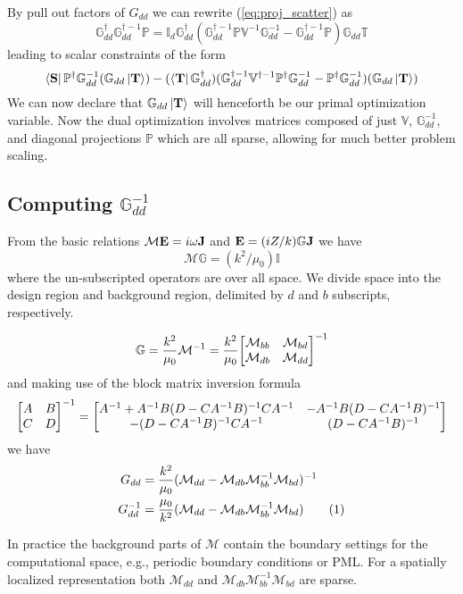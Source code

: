\documentclass[12pt]{article}
\newcommand\numthis{\stepcounter{equation}\tag{\theequation}}
\newcommand\G{\mathbb{G}}
\newcommand\T{\mathbb{T}}
\newcommand\V{\mathbb{V}}
\newcommand\I{\mathbb{I}}
\newcommand\Proj{\mathbb{P}}
\newcommand\M{\mathcal{M}}
\newcommand\om{\omega}
\begin{document}
By pull out factors of $G_{dd}$ we can rewrite (\ref{eq:proj_scatter}) as
\begin{equation}
\G_{dd}^\dagger \G_{dd}^{\dagger-1} \Proj = \I_d \G_{dd}^\dagger (\G_{dd}^{\dagger-1} \Proj \V^{-1} \G_{dd}^{-1} - \G_{dd}^{\dagger-1}\Proj) \G_{dd} \T
\end{equation}
leading to scalar constraints of the form
\begin{equation}
\bra{\vb{S}} \Proj^\dagger \G_{dd}^{-1} (\G_{dd}\ket{\vb{T}}) - (\bra{\vb{T}}\G_{dd}^\dagger) (\G_{dd}^{\dagger-1} \V^{\dagger-1}\Proj^\dagger\G_{dd}^{-1} - \Proj^\dagger\G_{dd}^{-1}) (\G_{dd} \ket{\vb{T}})
\end{equation}
We can now declare that $\G_{dd} \ket{\vb{T}}$ will henceforth be our primal optimization variable. Now the dual optimization involves matrices composed of just $\V$, $\G_{dd}^{-1}$, and diagonal projections $\Proj$ which are all sparse, allowing for much better problem scaling.

\subsection{Computing $\G_{dd}^{-1}$}
From the basic relations $\M\vb{E} = i\om\vb{J}$ and $\vb{E} = (iZ/k)\G \vb{J}$ we have
\begin{equation}
\M\G = (k^2/\mu_0) \I
\end{equation}
where the un-subscripted operators are over all space. We divide space into the design region and background region, delimited by $d$ and $b$ subscripts, respectively. 

\begin{equation}
\G = \frac{k^2}{\mu_0} \M^{-1} = \frac{k^2}{\mu_0} \mqty[\M_{bb} & \M_{bd} \\ \M_{db} & \M_{dd}]^{-1}
\end{equation}
and making use of the block matrix inversion formula
\begin{equation}
\mqty[A & B \\ C & D]^{-1} = \mqty[A^{-1} + A^{-1}B(D-CA^{-1}B)^{-1}CA^{-1} & -A^{-1} B (D-CA^{-1}B)^{-1} \\ -(D-CA^{-1}B)^{-1}CA^{-1} & (D-CA^{-1}B)^{-1}]
\end{equation}
we have
\begin{align*}
G_{dd} &= \frac{k^2}{\mu_0} (\M_{dd} - \M_{db}\M_{bb}^{-1}\M_{bd})^{-1} \\
G_{dd}^{-1} &= \frac{\mu_0}{k^2} (\M_{dd} - \M_{db}\M_{bb}^{-1}\M_{bd}) \numthis
\end{align*}

In practice the background parts of $\M$ contain the boundary settings for the computational space, e.g., periodic boundary conditions or PML. For a spatially localized representation both $\M_{dd}$ and $\M_{db}\M_{bb}^{-1}\M_{bd}$ are sparse.
\end{document}
